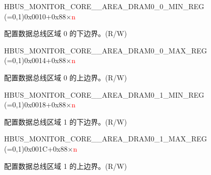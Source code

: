 \begin{register}{H}{BUS\_MONITOR\_CORE\_\_AREA\_DRAM0\_0\_MIN\_REG (=0,1)}{0x0010+0x88×\textcolor{red}{n}}\label{regdesc:BUSMONITORCORE0AREADRAM00MINREG}
%
\regnewline%
\begin{regdesc}\begin{reglist}
\label{fielddesc:BUSMONITORCORE0AREADRAM00MIN}\item [BUS\_MONITOR\_CORE\_\regindex{n}\_AREA\_DRAM0\_0\_MIN] 配置数据总线区域 0 的下边界。(R/W)
\end{reglist}\end{regdesc}
\end{register}


\begin{register}{H}{BUS\_MONITOR\_CORE\_\_AREA\_DRAM0\_0\_MAX\_REG (=0,1)}{0x0014+0x88×\textcolor{red}{n}}\label{regdesc:BUSMONITORCORE0AREADRAM00MAXREG}
%
\regnewline%
\begin{regdesc}\begin{reglist}
\label{fielddesc:BUSMONITORCORE0AREADRAM00MAX}\item [BUS\_MONITOR\_CORE\_\regindex{n}\_AREA\_DRAM0\_0\_MAX] 配置数据总线区域 0 的上边界。(R/W)
\end{reglist}\end{regdesc}
\end{register}


\begin{register}{H}{BUS\_MONITOR\_CORE\_\_AREA\_DRAM0\_1\_MIN\_REG (=0,1)}{0x0018+0x88×\textcolor{red}{n}}\label{regdesc:BUSMONITORCORE0AREADRAM01MINREG}
%
\regnewline%
\begin{regdesc}\begin{reglist}
\label{fielddesc:BUSMONITORCORE0AREADRAM01MIN}\item [BUS\_MONITOR\_CORE\_\regindex{n}\_AREA\_DRAM0\_1\_MIN] 配置数据总线区域 1 的下边界。(R/W)
\end{reglist}\end{regdesc}
\end{register}


\begin{register}{H}{BUS\_MONITOR\_CORE\_\_AREA\_DRAM0\_1\_MAX\_REG (=0,1)}{0x001C+0x88×\textcolor{red}{n}}\label{regdesc:BUSMONITORCORE0AREADRAM01MAXREG}
%
\regnewline%
\begin{regdesc}\begin{reglist}
\label{fielddesc:BUSMONITORCORE0AREADRAM01MAX}\item [BUS\_MONITOR\_CORE\_\regindex{n}\_AREA\_DRAM0\_1\_MAX] 配置数据总线区域 1 的上边界。(R/W)
\end{reglist}\end{regdesc}
\end{register}


